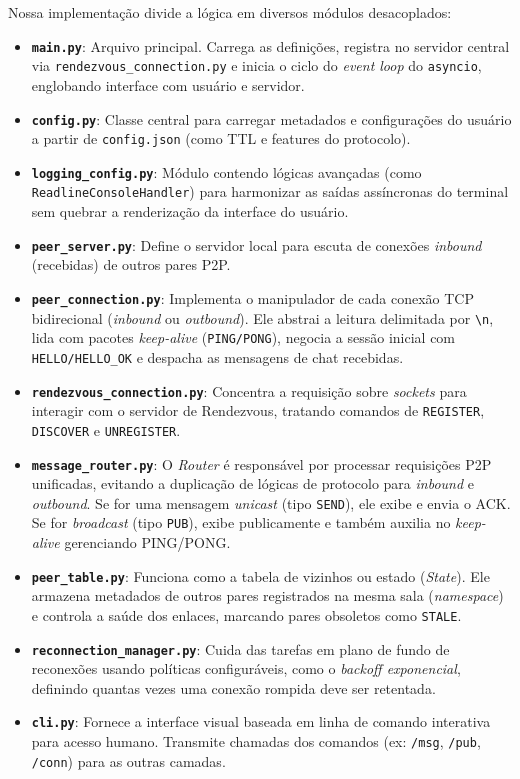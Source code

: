 \documentclass[12pt,a4paper]{article}
\begin{document}
Nossa implementação divide a lógica em diversos módulos desacoplados:
\begin{itemize}
    \item \textbf{\texttt{main.py}}: Arquivo principal. Carrega as definições, registra no servidor central via \texttt{rendezvous\_connection.py} e inicia o ciclo do \textit{event loop} do \texttt{asyncio}, englobando interface com usuário e servidor.
    \item \textbf{\texttt{config.py}}: Classe central para carregar metadados e configurações do usuário a partir de \texttt{config.json} (como TTL e features do protocolo).
    \item \textbf{\texttt{logging\_config.py}}: Módulo contendo lógicas avançadas (como \texttt{ReadlineConsoleHandler}) para harmonizar as saídas assíncronas do terminal sem quebrar a renderização da interface do usuário.
    \item \textbf{\texttt{peer\_server.py}}: Define o servidor local para escuta de conexões \textit{inbound} (recebidas) de outros pares P2P.
    \item \textbf{\texttt{peer\_connection.py}}: Implementa o manipulador de cada conexão TCP bidirecional (\textit{inbound} ou \textit{outbound}). Ele abstrai a leitura delimitada por \texttt{\textbackslash n}, lida com pacotes \textit{keep-alive} (\texttt{PING/PONG}), negocia a sessão inicial com \texttt{HELLO/HELLO\_OK} e despacha as mensagens de chat recebidas.
    \item \textbf{\texttt{rendezvous\_connection.py}}: Concentra a requisição sobre \textit{sockets} para interagir com o servidor de Rendezvous, tratando comandos de \texttt{REGISTER}, \texttt{DISCOVER} e \texttt{UNREGISTER}.
    \item \textbf{\texttt{message\_router.py}}: O \textit{Router} é responsável por processar requisições P2P unificadas, evitando a duplicação de lógicas de protocolo para \textit{inbound} e \textit{outbound}. Se for uma mensagem \textit{unicast} (tipo \texttt{SEND}), ele exibe e envia o ACK. Se for \textit{broadcast} (tipo \texttt{PUB}), exibe publicamente e também auxilia no \textit{keep-alive} gerenciando PING/PONG.
    \item \textbf{\texttt{peer\_table.py}}: Funciona como a tabela de vizinhos ou estado (\textit{State}). Ele armazena metadados de outros pares registrados na mesma sala (\textit{namespace}) e controla a saúde dos enlaces, marcando pares obsoletos como \texttt{STALE}.
    \item \textbf{\texttt{reconnection\_manager.py}}: Cuida das tarefas em plano de fundo de reconexões usando políticas configuráveis, como o \textit{backoff exponencial}, definindo quantas vezes uma conexão rompida deve ser retentada.
    \item \textbf{\texttt{cli.py}}: Fornece a interface visual baseada em linha de comando interativa para acesso humano. Transmite chamadas dos comandos (ex: \texttt{/msg}, \texttt{/pub}, \texttt{/conn}) para as outras camadas.
\end{itemize}
\end{document}
